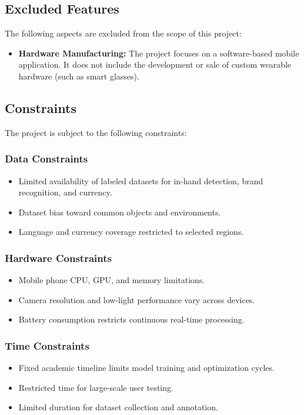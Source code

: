 \documentclass[a4paper]{report}
\begin{document}
\subsection{Excluded Features}

The following aspects are excluded from the scope of this project:

\begin{itemize}
    \item \textbf{Hardware Manufacturing:} The project focuses on a software-based mobile application. It does not include the development or sale of custom wearable hardware (such as smart glasses).
\end{itemize}

\subsection{Constraints}

The project is subject to the following constraints:

\subsubsection{Data Constraints}
\begin{itemize}
    \item Limited availability of labeled datasets for in-hand detection, brand recognition, and currency.
    \item Dataset bias toward common objects and environments.
    \item Language and currency coverage restricted to selected regions.
\end{itemize}

\subsubsection{Hardware Constraints}
\begin{itemize}
    \item Mobile phone CPU, GPU, and memory limitations.
    \item Camera resolution and low-light performance vary across devices.
    \item Battery consumption restricts continuous real-time processing.
\end{itemize}

\subsubsection{Time Constraints}
\begin{itemize}
    \item Fixed academic timeline limits model training and optimization cycles.
    \item Restricted time for large-scale user testing.
    \item Limited duration for dataset collection and annotation.
\end{itemize}
\end{document}
